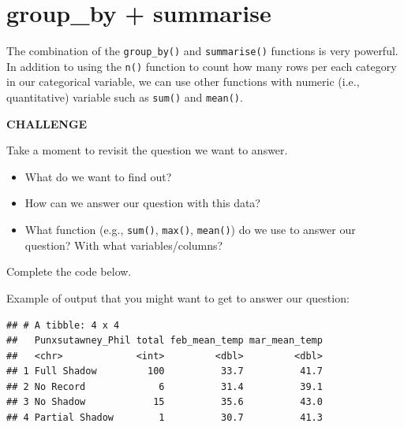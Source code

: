 \documentclass[
]{book}
\newenvironment{Shaded}{\begin{snugshade}}{\end{snugshade}}
\newcommand{\DataTypeTok}[1]{\textcolor[rgb]{0.13,0.29,0.53}{#1}}
\newcommand{\KeywordTok}[1]{\textcolor[rgb]{0.13,0.29,0.53}{\textbf{#1}}}
\newcommand{\NormalTok}[1]{#1}
\newcommand{\OperatorTok}[1]{\textcolor[rgb]{0.81,0.36,0.00}{\textbf{#1}}}
\newcommand{\StringTok}[1]{\textcolor[rgb]{0.31,0.60,0.02}{#1}}
\begin{document}
\hypertarget{group_by-summarise}{%
\section{group\_by + summarise}\label{group_by-summarise}}

The combination of the \texttt{group\_by()} and \texttt{summarise()} functions is very powerful. In addition to using the \texttt{n()} function to count how many rows per each category in our categorical variable, we can use other functions with numeric (i.e., quantitative) variable such as \texttt{sum()} and \texttt{mean()}.

\textbf{CHALLENGE}

Take a moment to revisit the question we want to answer.

\begin{itemize}
\item
  What do we want to find out?
\item
  How can we answer our question with this data?
\item
  What function (e.g., \texttt{sum()}, \texttt{max()}, \texttt{mean()}) do we use to answer our question? With what variables/columns?
\end{itemize}

Complete the code below.

\begin{Shaded}
\end{Shaded}

Example of output that you might want to get to answer our question:

\begin{verbatim}
## # A tibble: 4 x 4
##   Punxsutawney_Phil total feb_mean_temp mar_mean_temp
##   <chr>             <int>         <dbl>         <dbl>
## 1 Full Shadow         100          33.7          41.7
## 2 No Record             6          31.4          39.1
## 3 No Shadow            15          35.6          43.0
## 4 Partial Shadow        1          30.7          41.3
\end{verbatim}
\end{document}
